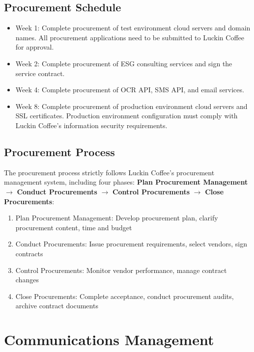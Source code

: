 \documentclass[12pt,a4paper]{article}
\begin{document}
\subsection{Procurement Schedule}
\begin{itemize}
  \item Week 1: Complete procurement of test environment cloud servers and domain names. All procurement applications need to be submitted to Luckin Coffee for approval.
  \item Week 2: Complete procurement of ESG consulting services and sign the service contract.
  \item Week 4: Complete procurement of OCR API, SMS API, and email services.
  \item Week 8: Complete procurement of production environment cloud servers and SSL certificates. Production environment configuration must comply with Luckin Coffee's information security requirements.
\end{itemize}

\subsection{Procurement Process}
The procurement process strictly follows Luckin Coffee's procurement management system, including four phases: \textbf{Plan Procurement Management} $\to$ \textbf{Conduct Procurements} $\to$ \textbf{Control Procurements} $\to$ \textbf{Close Procurements}:
\begin{enumerate}[leftmargin=*]
  \item Plan Procurement Management: Develop procurement plan, clarify procurement content, time and budget
  \item Conduct Procurements: Issue procurement requirements, select vendors, sign contracts
  \item Control Procurements: Monitor vendor performance, manage contract changes
  \item Close Procurements: Complete acceptance, conduct procurement audits, archive contract documents
\end{enumerate}

\clearpage
\section{Communications Management}
\end{document}
